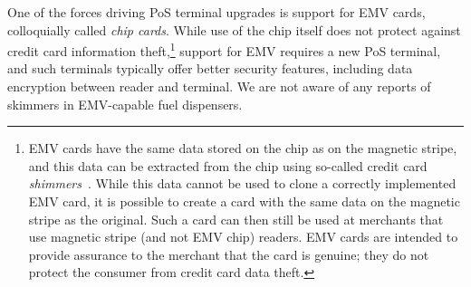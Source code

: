 One of the forces driving PoS terminal upgrades is support for EMV cards, colloquially called \emph{chip cards}. While use of the chip itself does not protect against credit card information theft,\footnote{EMV cards have the same data stored on the chip as on the magnetic stripe, and this data can be extracted from the chip using so-called credit card \emph{shimmers}~\cite{krebshimmer}. While this data cannot be used to clone a correctly implemented EMV card, it is possible to create a card with the same data on the magnetic stripe as the original. Such a card can then still be used at merchants that use magnetic stripe (and not EMV chip) readers. EMV cards are intended to provide assurance to the merchant that the card is genuine; they do not protect the consumer from credit card data theft.} support for EMV requires a new PoS terminal, and such terminals typically offer better security features, including data encryption between reader and terminal. We are not aware of any reports of skimmers in EMV-capable fuel dispensers.

